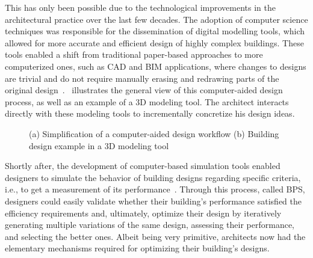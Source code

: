 	This has only been possible due to the technological improvements in the architectural practice over the last few decades. The adoption of computer science techniques was responsible for the dissemination of digital modelling tools, which allowed for more accurate and efficient design of highly complex buildings. These tools enabled a shift from traditional paper-based approaches to more computerized ones, such as \ac{CAD} and \ac{BIM} applications, where changes to designs are trivial and do not require manually erasing and redrawing parts of the original design~\cite{Ferreira2015GD}.~ illustrates the general view of this computer-aided design process, as well as an example of a 3D modeling tool. The architect interacts directly with these modeling tools to incrementally concretize his design ideas.
	
\begin{figure}[htbp]
\centering
{}%
\hfill
{}%

\caption[General views of Traditional Design Approaches]{(a) Simplification of a computer-aided design workflow (b) Building design example in a 3D modeling tool}
\label{fig:traditionaldesign}
\end{figure}

	Shortly after, the development of computer-based simulation tools enabled designers to simulate the behavior of building designs regarding specific criteria, i.e., to get a measurement of its performance~\cite{Malkawi2005}. Through this process, called \ac{BPS}, designers could easily validate whether their building's performance satisfied the efficiency requirements and, ultimately, optimize their design by iteratively generating multiple variations of the same design, assessing their performance, and selecting the better ones. Albeit being very primitive, architects now had the elementary mechanisms required for optimizing their building's designs.

